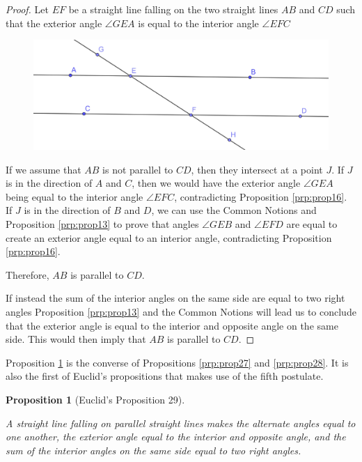 \documentclass[
]{book}
\newtheorem{proposition}{Proposition}[chapter]
\theoremstyle{definition}
\theoremstyle{definition}
\theoremstyle{definition}
\theoremstyle{definition}
\theoremstyle{remark}
\begin{document}
\begin{proof}

Let \(EF\) be a straight line falling on the two straight lines \(AB\) and \(CD\) such that the exterior angle \(\angle GEA\) is equal to the interior angle \(\angle EFC\)

\begin{figure}

{\centering \includegraphics[width=0.75\linewidth]{images/Prop28} 

}

\end{figure}

If we assume that \(AB\) is not parallel to \(CD\), then they intersect at a point \(J\). If \(J\) is in the direction of \(A\) and \(C\), then we would have the exterior angle \(\angle GEA\) being equal to the interior angle \(\angle EFC\), contradicting Proposition \ref{prp:prop16}. If \(J\) is in the direction of \(B\) and \(D\), we can use the Common Notions and Proposition \ref{prp:prop13} to prove that angles \(\angle GEB\) and \(\angle EFD\) are equal to create an exterior angle equal to an interior angle, contradicting Proposition \ref{prp:prop16}.

Therefore, \(AB\) is parallel to \(CD\).

If instead the sum of the interior angles on the same side are equal to two right angles Proposition \ref{prp:prop13} and the Common Notions will lead us to conclude that the exterior angle is equal to the interior and opposite angle on the same side. This would then imply that \(AB\) is parallel to \(CD\).

\end{proof}

Proposition \ref{prp:prop29} is the converse of Propositions \ref{prp:prop27} and \ref{prp:prop28}. It is also the first of Euclid's propositions that makes use of the fifth postulate.

\begin{proposition}[Euclid's Proposition 29]
\protect\hypertarget{prp:prop29}{}\label{prp:prop29}

A straight line falling on parallel straight lines makes the alternate angles equal to one another, the exterior angle equal to the interior and opposite angle, and the sum of the interior angles on the same side equal to two right angles.

\end{proposition}
\end{document}
